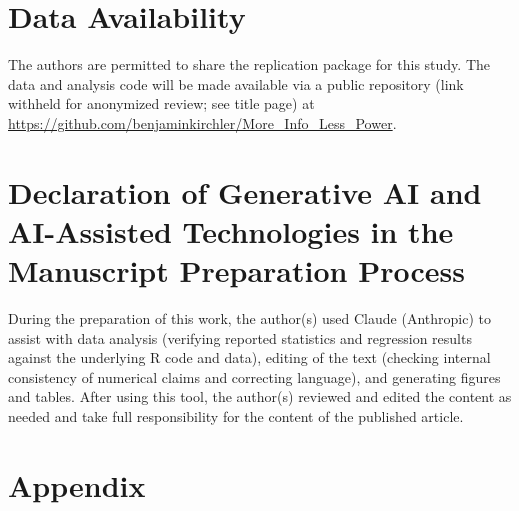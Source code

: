 \documentclass[12pt,a4paper]{article}
\begin{document}
\section*{Data Availability}
The authors are permitted to share the replication package for this study. The data and analysis code will be made available via a public repository\ifanonymous{} (link withheld for anonymized review; see title page)\else{} at \url{https://github.com/benjaminkirchler/More_Info_Less_Power}\fi.

\section*{Declaration of Generative AI and AI-Assisted Technologies in the Manuscript Preparation Process}
During the preparation of this work, the author(s) used Claude (Anthropic) to assist with data analysis (verifying reported statistics and regression results against the underlying R code and data), editing of the text (checking internal consistency of numerical claims and correcting language), and generating figures and tables. After using this tool, the author(s) reviewed and edited the content as needed and take full responsibility for the content of the published article.

\newpage

\printbibliography

\section{Appendix}

\end{document}
